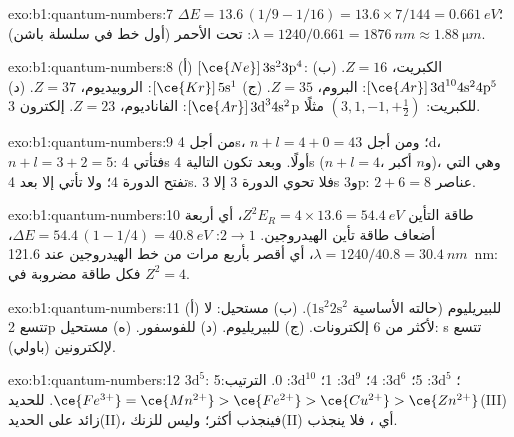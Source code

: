 \begin{solution}{exo:b1:quantum-numbers:7}
$\Delta E = 13.6\,(1/9 - 1/16) = 13.6 \times 7/144 = \qty{0.661}{eV}$؛
$\lambda = 1240/0.661 = \qty{1876}{nm} \approx \qty{1.88}{\micro m}$:
تحت الأحمر (أول خط في سلسلة باشن).
\end{solution}

\begin{solution}{exo:b1:quantum-numbers:8}
(أ) $[\ce{Ne}]\,3\text{s}^2 3\text{p}^4$: الكبريت، $Z = 16$.
(ب) $[\ce{Ar}]\,3\text{d}^{10} 4\text{s}^2 4\text{p}^5$: البروم، $Z = 35$.
(ج) $[\ce{Kr}]\,5\text{s}^1$: الروبيديوم، $Z = 37$.
(د) $[\ce{Ar}]\,3\text{d}^3 4\text{s}^2$: الفاناديوم، $Z = 23$.
إلكترون 3p للكبريت: $(3, 1, -1, +\tfrac12)$ مثلًا.
\end{solution}

\begin{solution}{exo:b1:quantum-numbers:9}
من أجل 4s، $n + l = 4 + 0 = 4$؛ ومن أجل 3d، $n + l = 3 + 2 = 5$: فتأتي 4s
أولًا. وبعد  تكون  التالية 4s ($n + l = 4$، و$n$
أكبر)، وهي التي تفتح الدورة 4؛ ولا تأتي  إلا بعد 4s.
فلا تحوي الدورة 3 إلا 3s و3p: $2 + 6 = 8$ عناصر.
\end{solution}

\begin{solution}{exo:b1:quantum-numbers:10}
طاقة التأين $Z^2E_R = 4 \times 13.6 = \qty{54.4}{eV}$، أي أربعة أضعاف
طاقة تأين الهيدروجين. $2 \to 1$: $\Delta E = 54.4\,(1 - 1/4) = \qty{40.8}{eV}$،
$\lambda = 1240/40.8 = \qty{30.4}{nm}$، أي أقصر بأربع مرات من خط
الهيدروجين عند \qty{121.6}{nm}: فكل طاقة مضروبة في $Z^2 = 4$.
\end{solution}

\begin{solution}{exo:b1:quantum-numbers:11}
(أ)  للبيريليوم (حالته الأساسية $1\text{s}^2 2\text{s}^2$).
(ب) مستحيل: لا تتسع 2p لأكثر من 6 إلكترونات. (ج) 
للبيريليوم. (د)  للفوسفور. (ه) مستحيل:  s
تتسع لإلكترونين (باولي).
\end{solution}

\begin{solution}{exo:b1:quantum-numbers:12}
 $3\text{d}^5$: 5؛  $3\text{d}^5$: 5؛ 
$3\text{d}^6$: 4؛  $3\text{d}^9$: 1؛ 
$3\text{d}^{10}$: 0. الترتيب: $\ce{Fe^{3+}} = \ce{Mn^{2+}} > \ce{Fe^{2+}}
> \ce{Cu^{2+}} > \ce{Zn^{2+}}$. للحديد(III)  زائد على
الحديد(II)، فينجذب أكثر؛ وليس للزنك(II) أي ، فلا
ينجذب.
\end{solution}

